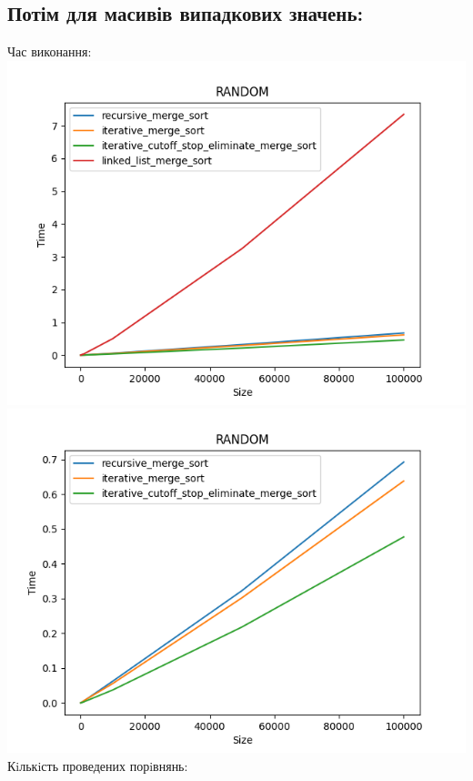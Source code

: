 \documentclass{article}
\begin{document}
    \subsection{Потім для масивів випадкових значень:} 
    Час виконання:
    \newline
        \includegraphics[scale=0.5]{random_Time_4_sorts_6_numbers_50_100to100000.png}
        \includegraphics[scale=0.5]{random_Time_3_sorts_6_numbers_50_100to100000.png}
    \newline
    Кiлькiсть проведених порiвнянь:
    \newline
\end{document}
